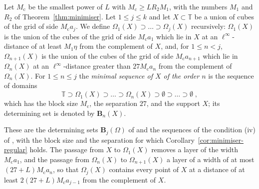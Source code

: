 \documentclass[11pt]{preprint}
\numberwithin{equation}{section}
\begin{document}
\begin{definition}\label{def:minimal-sequence}
Let $M_{\mathrm c}$ be the smallest power of $L$ with $M_{\mathrm c} \geqslant LR_2M_1$, with the numbers $M_1$ and $R_2$ of Theorem~\ref{thm:minimiser}. Let $1 \leqslant j \leqslant k$ and let $X \subset \mathbb T$ be a union of cubes of the grid of side $M_{\mathrm c}a_j$. We define $\Omega_1(X) \supset \dots \supset \Omega_j(X)$ recursively: $\Omega_1(X)$ is the union of the cubes of the grid of side $M_{\mathrm c}a_1$ which lie in $X$ at an $\ell^\infty$-distance of at least $M_1\eta$ from the complement of $X$, and, for $1 \leqslant n < j$, $\Omega_{n+1}(X)$ is the union of the cubes of the grid of side $M_{\mathrm c}a_{n+1}$ which lie in $\Omega_n(X)$ at an $\ell^\infty$-distance greater than $27M_{\mathrm c}a_n$ from the complement of $\Omega_n(X)$. For $1 \leqslant n \leqslant j$ the \emph{minimal sequence of $X$ of the order $n$} is the sequence of domains
\begin{equation}\label{eq:minimal-sequence}
    \mathbb T \supset \Omega_1(X) \supset \dots \supset \Omega_n(X) \supset \emptyset \supset \dots \supset \emptyset\;,
\end{equation}
which has the block size $M_{\mathrm c}$, the separation $27$, and the support $X$; its determining set is denoted by $\mathbf B_n(X)$.
\end{definition}

These are the determining sets $\mathbf B_j(\Omega)$ of \cite[p.~256]{BalabanCRE} and the sequences of the condition (iv) of \cite[p.~262]{BalabanRG1}, with the block size and the separation for which Corollary~\ref{cor:minimiser-regular} holds. The passage from $X$ to $\Omega_1(X)$ removes a layer of the width $M_{\mathrm c}a_1$, and the passage from $\Omega_n(X)$ to $\Omega_{n+1}(X)$ a layer of a width of at most $(27 + L)M_{\mathrm c}a_n$, so that $\Omega_j(X)$ contains every point of $X$ at a distance of at least $2(27 + L)M_{\mathrm c}a_{j-1}$ from the complement of $X$.
\end{document}

